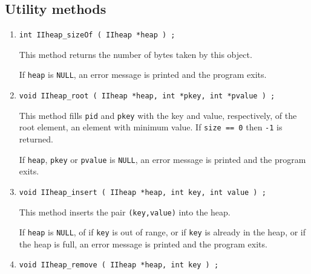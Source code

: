\subsection{Utility methods}
\label{subsection:IIheap:proto:utilities}
\par
\begin{enumerate}
\item
\begin{verbatim}
int IIheap_sizeOf ( IIheap *heap ) ;
\end{verbatim}
This method returns the number of bytes taken by this object.
\par {}
If {\tt heap} is {\tt NULL},
an error message is printed and the program exits.
\item
\begin{verbatim}
void IIheap_root ( IIheap *heap, int *pkey, int *pvalue ) ;
\end{verbatim}
This method fills {\tt *pid} and {\tt *pkey} with the key and value, 
respectively, of the root element, an element with minimum value.
If {\tt size == 0} then {\tt -1} is returned.
\par {}
If {\tt heap}, {\tt pkey} or {\tt pvalue} is {\tt NULL},
an error message is printed and the program exits.
\item
\begin{verbatim}
void IIheap_insert ( IIheap *heap, int key, int value ) ;
\end{verbatim}
This method inserts the pair {\tt (key,value)} into the heap.
\par {}
If {\tt heap} is {\tt NULL},
of if {\tt key} is out of range,
or if {\tt key} is already in the heap,
or if the heap is full,
an error message is printed and the program exits.
\item
\begin{verbatim}
void IIheap_remove ( IIheap *heap, int key ) ;
\end{verbatim}

\end{enumerate}
